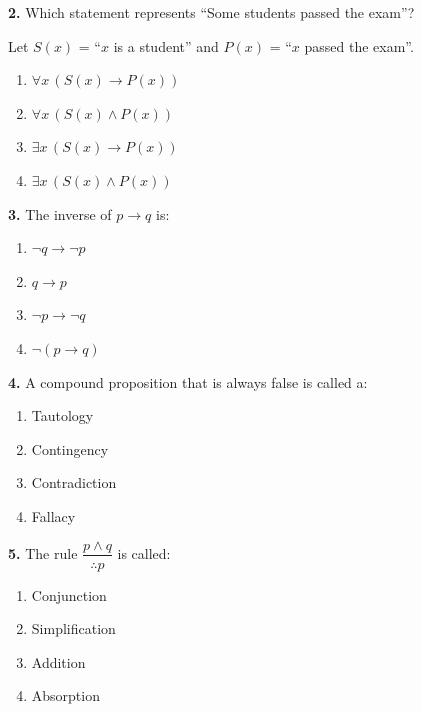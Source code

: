 \documentclass[11pt,a4paper]{article}
\begin{document}
\textbf{2.} Which statement represents ``Some students passed the exam''?

Let $S(x)$ = ``$x$ is a student'' and $P(x)$ = ``$x$ passed the exam''.

\begin{enumerate}[label=(\Alph*),noitemsep]
    \item $\forall x\, (S(x) \to P(x))$
    \item $\forall x\, (S(x) \land P(x))$
    \item $\exists x\, (S(x) \to P(x))$
    \item $\exists x\, (S(x) \land P(x))$
\end{enumerate}

\vspace{25pt}

\textbf{3.} The inverse of $p \to q$ is:

\begin{enumerate}[label=(\Alph*),noitemsep]
    \item $\neg q \to \neg p$
    \item $q \to p$
    \item $\neg p \to \neg q$
    \item $\neg(p \to q)$
\end{enumerate}

\vspace{25pt}

\textbf{4.} A compound proposition that is always false is called a:

\begin{enumerate}[label=(\Alph*),noitemsep]
    \item Tautology
    \item Contingency
    \item Contradiction
    \item Fallacy
\end{enumerate}

\vspace{25pt}

\textbf{5.} The rule $\dfrac{p \land q}{\therefore p}$ is called:

\begin{enumerate}[label=(\Alph*),noitemsep]
    \item Conjunction
    \item Simplification
    \item Addition
    \item Absorption
\end{enumerate}
\end{document}

